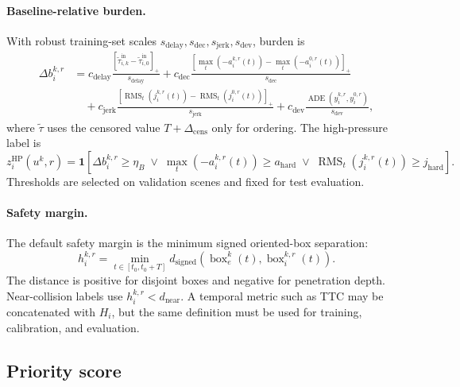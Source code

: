 \documentclass[10pt]{article}
\newcommand{\ind}{\mathbf{1}}
\begin{document}
\paragraph{Baseline-relative burden.}
With robust training-set scales \(s_{\mathrm{delay}},s_{\mathrm{dec}},s_{\mathrm{jerk}},s_{\mathrm{dev}}\), burden is
\begin{equation}
\begin{aligned}
    \Delta b_i^{k,r}
    &=
    c_{\mathrm{delay}}
    \frac{\left[
    \tilde\tau_{i,k}^{\mathrm{in}}-\tilde\tau_{i,0}^{\mathrm{in}}
    \right]_+}{s_{\mathrm{delay}}}
    +
    c_{\mathrm{dec}}
    \frac{\left[
    \max_t(-a_i^{k,r}(t))-\max_t(-a_i^{0,r}(t))
    \right]_+}{s_{\mathrm{dec}}} \\
    &\quad+
    c_{\mathrm{jerk}}
    \frac{\left[
    \operatorname{RMS}_t(j_i^{k,r}(t))-\operatorname{RMS}_t(j_i^{0,r}(t))
    \right]_+}{s_{\mathrm{jerk}}}
    +
    c_{\mathrm{dev}}
    \frac{\operatorname{ADE}(y_i^{k,r},y_i^{0,r})}{s_{\mathrm{dev}}},
\end{aligned}
\label{eq:appendix_burden}
\end{equation}
where \(\tilde\tau\) uses the censored value \(T+\Delta_{\mathrm{cens}}\) only for ordering. The high-pressure label is
\[
z_i^{\mathrm{HP}}(u^k,r)
=
\ind\!\left[
\Delta b_i^{k,r}\ge\eta_B
\;\lor\;
\max_t(-a_i^{k,r}(t))\ge a_{\mathrm{hard}}
\;\lor\;
\operatorname{RMS}_t(j_i^{k,r}(t))\ge j_{\mathrm{hard}}
\right].
\]
Thresholds are selected on validation scenes and fixed for test evaluation.

\paragraph{Safety margin.}
The default safety margin is the minimum signed oriented-box separation:
\begin{equation}
    h_i^{k,r}
    =
    \min_{t\in[t_0,t_0+T]}
    d_{\mathrm{signed}}
    \left(
    \operatorname{box}_e^k(t),
    \operatorname{box}_i^{k,r}(t)
    \right).
    \label{eq:appendix_margin}
\end{equation}
The distance is positive for disjoint boxes and negative for penetration depth. Near-collision labels use \(h_i^{k,r}<d_{\mathrm{near}}\). A temporal metric such as TTC may be concatenated with \(H_i\), but the same definition must be used for training, calibration, and evaluation.

\subsection{Priority score}
\label{app:priority_score}
\end{document}
